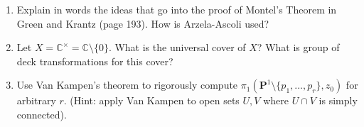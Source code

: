 \documentclass[a4paper,10pt]{article}
\newcommand{\CC}{\mathbb{C}}
\begin{document}
\begin{enumerate}
	\item Explain in words the ideas that go into the proof of Montel's Theorem in Green and Krantz (page 193). 
	How is Arzela-Ascoli used?
	
	\item Let $X=\CC^{\times} = \CC \setminus \lbrace 0 \rbrace$. 
	What is the universal cover of $X$? What is group of deck transformations for this cover? 
	
	
	\item Use Van Kampen's theorem to rigorously compute 
	$\pi_1(\mathbf{P}^1\setminus \lbrace p_1,\ldots, p_r\rbrace, z_0)$ for arbitrary $r$. (Hint: apply Van Kampen to open sets $U,V$ where $U\cap V$ is simply connected). 
	
\end{enumerate}
\end{document}
